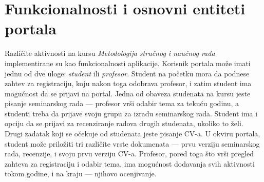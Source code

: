 \documentclass[12pt,oneside]{memoir}
\begin{document}
\section{Funkcionalnosti i osnovni entiteti portala}
\label{sec:entiteti}
\par Različite aktivnosti na kursu \emph{Metodologija stručnog i naučnog rada} implementirane su kao funkcionalnosti aplikacije. Korisnik portala može imati jednu od dve uloge: \emph{student} ili \emph{profesor}. Student na početku mora da podnese zahtev za registraciju, koju nakon toga odobrava profesor, i zatim student ima mogućnost da se prijavi na portal. Jedna od obaveza studenata na kursu jeste pisanje seminarskog rada --- profesor vrši odabir tema za tekuću godinu, a studenti treba da prijave svoju grupu za izradu seminarskog rada. Student ima i opciju da se prijavi za recenziranje radova drugih studenata, ukoliko to želi. Drugi zadatak koji se očekuje od studenata jeste pisanje CV-a. U okviru portala, student može priložiti tri različite vrste dokumenata --- prvu verziju seminarskog rada, recenzije, i svoju prvu verziju CV-a. Profesor, pored toga što vrši pregled zahteva za registraciju i odabir tema, ima mogućnost dodavanja svih aktivnosti tokom godine, i na kraju --- njihovo ocenjivanje.
\end{document}
